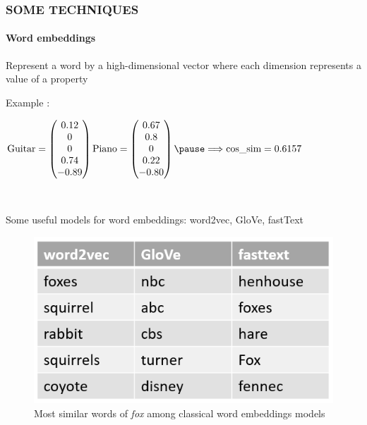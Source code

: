 \documentclass[10pt]{beamer}
\begin{document}
\begin{frame}
    \frametitle{\textbf{SOME TECHNIQUES}}
    \framesubtitle{\textbf{Word embeddings}}
    \begin{definition}
        Represent a word by a high-dimensional vector where each dimension represents a value of a property
    \end{definition}\pause
    Example : \\
    \begin{center}
        \begin{math}
        \mbox{Guitar} = \begin{pmatrix} 0.12 \\ 0 \\ 0 \\ 0.74 \\ -0.89 \end{pmatrix}
        \mbox{Piano} = \begin{pmatrix} 0.67 \\ 0.8 \\ 0 \\ 0.22 \\ -0.80 \end{pmatrix} \pause
        \Longrightarrow\mbox{cos\_sim} = 0.6157
        \end{math} 
    \end{center}\\ \pause
    \begin{minipage}{0.4\textwidth}
        Some useful models for word embeddings: word2vec, GloVe, fastText 
    \end{minipage}
    \begin{minipage}{0.55\textwidth}
        \begin{center}
            \begin{figure}[]
                \centering
                \includegraphics[scale=0.22]{word_embedding.png}
                \caption{Most similar words of \textit{fox} among classical word embeddings models}
            \end{figure}
        \end{center}
    \end{minipage}
\end{frame}
\end{document}
